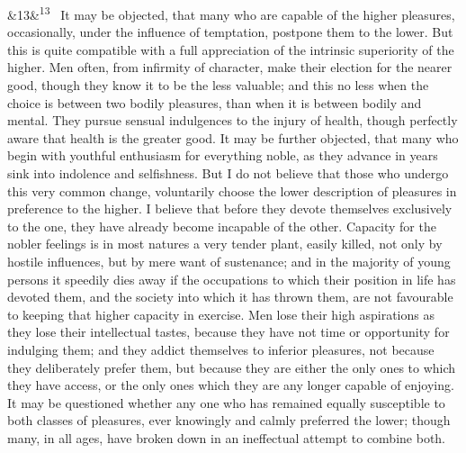 \documentclass[12pt]{article}
\newcommand{\para}[1][]{\par\noindent\ifx&#1&\else\textsuperscript{\footnotesize #1}~\fi}
\begin{document}
\para[13] It may be objected, that many who are capable of the higher pleasures, occasionally, under the influence of temptation, postpone them to the lower. But this is quite compatible with a full appreciation of the intrinsic superiority of the higher. Men often, from infirmity of character, make their election for the nearer good, though they know it to be the less valuable; and this no less when the choice is between two bodily pleasures, than when it is between bodily and mental. They pursue sensual indulgences to the injury of health, though perfectly aware that health is the greater good. It may be further objected, that many who begin with youthful enthusiasm for everything noble, as they advance in years sink into indolence and selfishness. But I do not believe that those who undergo this very common change, voluntarily choose the lower description of pleasures in preference to the higher. I believe that before they devote themselves exclusively to the one, they have already become incapable of the other. Capacity for the nobler feelings is in most natures a very tender plant, easily killed, not only by hostile influences, but by mere want of sustenance; and in the majority of young persons it speedily dies away if the occupations to which their position in life has devoted them, and the society into which it has thrown them, are not favourable to keeping that higher capacity in exercise. Men lose their high aspirations as they lose their intellectual tastes, because they have not time or opportunity for indulging them; and they addict themselves to inferior pleasures, not because they deliberately prefer them, but because they are either the only ones to which they have access, or the only ones which they are any longer capable of enjoying. It may be questioned whether any one who has remained equally susceptible to both classes of pleasures, ever knowingly and calmly preferred the lower; though many, in all ages, have broken down in an ineffectual attempt to combine both.
\end{document}
